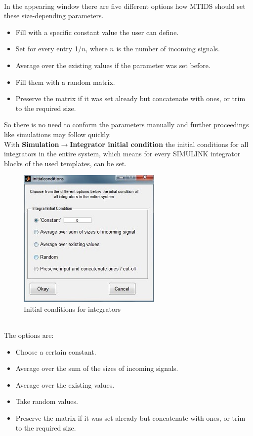 \documentclass[12pt]{report}
\begin{document}
\\
In the appearing window there are five different options how MTIDS should set these size-depending parameters.
\begin{itemize}
	\item Fill with a specific constant value the user can define.
	\item Set for every entry 1/$n$, where $n$ is the number of incoming signals.
	\item Average over the existing values if the parameter was set before.
	\item Fill them with a random matrix.
	\item Preserve the matrix if it was set already but concatenate with ones, or trim to the required size.
\end{itemize}
So there is no need to conform the parameters manually and further proceedings like simulations may follow quickly.\\
With \textbf{Simulation$\rightarrow$Integrator initial condition} the initial conditions for all integrators in the entire system, which means for every SIMULINK integrator blocks of the used templates, can be set.\\
\begin{figure}[h]
\centering
\includegraphics[scale=.9]{initialcond}
\caption{Initial conditions for integrators}
\label{FIG:abb21}
\end{figure}
\\
The options are:
\begin{itemize}
	\item Choose a certain constant.
	\item Average over the sum of the sizes of incoming signals.
	\item Average over the existing values.
	\item Take random values.
	\item Preserve the matrix if it was set already but concatenate with ones, or trim to the required size.
\end{itemize}
\end{document}
